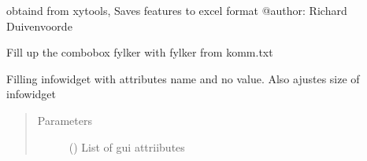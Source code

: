 \documentclass[letterpaper,10pt,english]{sphinxmanual}
\begin{document}
\begin{fulllineitems}
\begin{fulllineitems}
\begin{quote}
\begin{description}
\end{description}\end{quote}

\end{fulllineitems}


\begin{fulllineitems}
\label{\detokenize{code:Tilgjengelighet.Tilgjengelighet.excelSave}}
obtaind from xytools, Saves features to excel format
@author: Richard Duivenvoorde

\end{fulllineitems}


\begin{fulllineitems}
\label{\detokenize{code:Tilgjengelighet.Tilgjengelighet.fill_combobox}}
\end{fulllineitems}


\begin{fulllineitems}
\label{\detokenize{code:Tilgjengelighet.Tilgjengelighet.fill_fylker}}
Fill up the combobox fylker with fylker from komm.txt

\end{fulllineitems}


\begin{fulllineitems}
\label{\detokenize{code:Tilgjengelighet.Tilgjengelighet.fill_infoWidget}}
Filling infowidget with attributes name and no value. Also ajustes size of infowidget
\begin{quote}\begin{description}
\item[{Parameters}] \leavevmode
{} () \textendash{} List of gui attriibutes


\end{description}
\end{quote}
\end{fulllineitems}
\end{fulllineitems}
\end{document}
